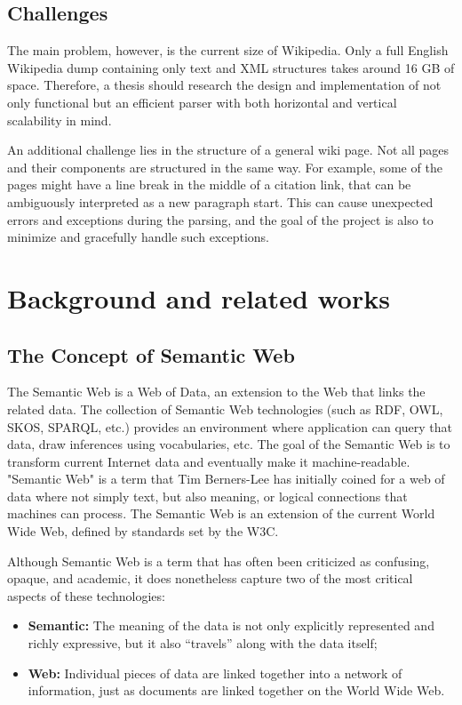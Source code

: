 \documentclass[thesis=M,english,hidelinks]{FITthesis}[2019/12/23]
\begin{document}
\begin{introduction}
  \section{Challenges}
	The main problem, however, is the current size of Wikipedia. Only a full English Wikipedia dump containing only text and XML structures takes around 16 GB of space. Therefore, a thesis should research the design and implementation of not only functional but an efficient parser with both horizontal and vertical scalability in mind.

	An additional challenge lies in the structure of a general wiki page. Not all pages and their components are structured in the same way. For example, some of the pages might have a line break in the middle of a citation link, that can be ambiguously interpreted as a new paragraph start. This can cause unexpected errors and exceptions during the parsing, and the goal of the project is also to minimize and gracefully handle such exceptions.
	
\end{introduction}

\chapter{Background and related works}

\section{The Concept of Semantic Web}

The Semantic Web is a Web of Data, an extension to the Web that links the related data. The collection of Semantic Web technologies (such as \gls{RDF}, \gls{OWL}, \gls{SKOS}, \gls{SPARQL}, etc.) provides an environment where application can query that data, draw inferences using vocabularies, etc. The goal of the Semantic Web is to transform current Internet data and eventually make it machine-readable.  "Semantic Web" is a term that Tim Berners-Lee has initially coined\cite{Berners_QA} for a web of data where not simply text, but also meaning, or logical connections that machines can process.
The Semantic Web is an extension of the current World Wide Web, defined by standards set by the \gls{W3C}.

Although Semantic Web is a term that has often been criticized as confusing, opaque, and academic, it does nonetheless capture two of the most critical aspects of these technologies:

\begin{itemize}
	\item  \textbf{Semantic:} The meaning of the data is not only explicitly represented and richly expressive, but it also “travels” along with the data itself;
	\item \textbf{Web:} Individual pieces of data are linked together into a network of information, just as documents are linked together on the World Wide Web.
\end{itemize}
\end{document}
